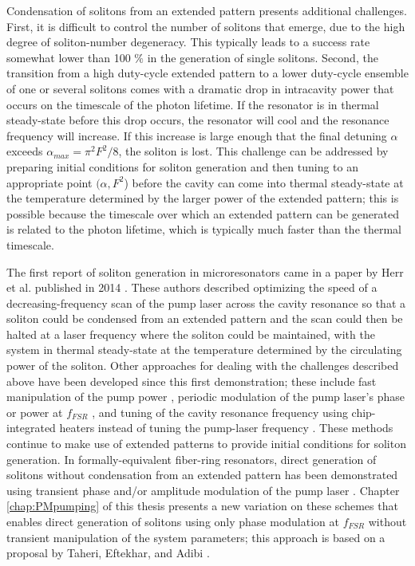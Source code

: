 {Condensation of solitons from an extended pattern presents additional challenges. First, it is difficult to control the number of solitons that emerge, due to the high degree of soliton-number degeneracy. This typically leads to a success rate somewhat lower than 100 $\%$ in the generation of single solitons. Second, the transition from a high duty-cycle extended pattern to a lower duty-cycle ensemble of one or several solitons comes with a dramatic drop in intracavity power that occurs on the timescale of the photon lifetime. If the resonator is in thermal steady-state before this drop occurs, the resonator will cool and the resonance frequency will increase. If this increase is large enough that the final detuning $\alpha$ exceeds $\alpha_{max}=\pi^2 F^2/8$, the soliton is lost. This challenge can be addressed by preparing initial conditions for soliton generation and then tuning to an appropriate point $(\alpha,F^2$) before the cavity can come into thermal steady-state at the temperature determined by the larger power of the extended pattern; this is possible because the timescale over which an extended pattern can be generated is related to the photon lifetime, which is typically much faster than the thermal timescale.

The first report of soliton generation in microresonators came in a paper by Herr et al. published in 2014 \cite{Herr2014wArxiv}. These authors described optimizing the speed of a decreasing-frequency scan of the pump laser across the cavity resonance so that a soliton could be condensed from an extended pattern and the scan could then be halted at a laser frequency where the soliton could be maintained, with the system in thermal steady-state at the temperature determined by the circulating power of the soliton. Other approaches for dealing with the challenges described above have been developed since this first demonstration; these include fast manipulation of the pump power \cite{Brasch2016,Yi2015}, periodic modulation of the pump laser's phase or power at $f_{FSR}$ \cite{Lobanov2016,Obrzud2017}, and tuning of the cavity resonance frequency using chip-integrated heaters instead of tuning the pump-laser frequency \cite{Joshi2016,Wang2018a}. These methods continue to make use of extended patterns to provide initial conditions for soliton generation. In formally-equivalent fiber-ring resonators, direct generation of solitons without condensation from an extended pattern has been demonstrated using transient phase and/or amplitude modulation of the pump laser \cite{Jang2015,Jang2015a,Wang2018}. Chapter \ref{chap:PMpumping} of this thesis presents a new variation on these schemes that enables direct generation of solitons using only phase modulation at $f_{FSR}$ without transient manipulation of the system parameters; this approach is based on a proposal by Taheri, Eftekhar, and Adibi \cite{Taheri2015}. 

}
